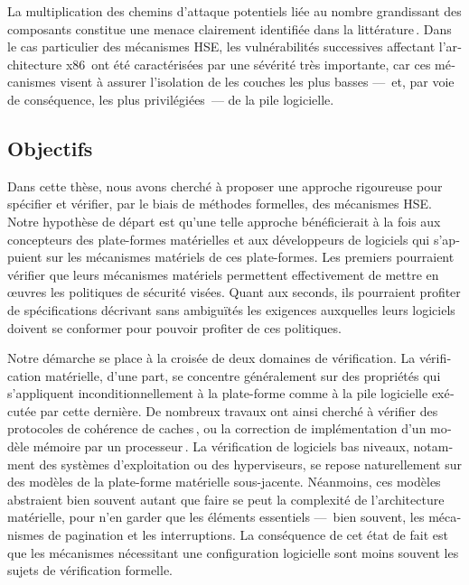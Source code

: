 \begin{otherlanguage}{french}
  La multiplication des chemins d’attaque potentiels liée au nombre grandissant
  des composants constitue une menace clairement identifiée dans la
  littérature\,\cite{wing2003compositionalattack}.
  Dans le cas particulier des mécanismes HSE, les vulnérabilités successives
  affectant l’architecture
  x86\,\cite{duflot2009smram,wojtczuk2009smram,domas2015sinkhole,kallenberg2015racecondition,kovah2015senter}
  ont été caractérisées par une sévérité très importante, car ces mécanismes
  visent à assurer l’isolation de les couches les plus basses ---~et, par voie de
  conséquence, les plus privilégiées~--- de la pile logicielle.

  \subsection*{Objectifs}

  Dans cette thèse, nous avons cherché à proposer une approche rigoureuse pour
  spécifier et vérifier, par le biais de méthodes formelles, des mécanismes HSE.
  Notre hypothèse de départ est qu’une telle approche bénéficierait à la fois
  aux concepteurs des plate-formes matérielles et aux développeurs de logiciels
  qui s'appuient sur les mécanismes matériels de ces plate-formes.
  Les premiers pourraient vérifier que leurs mécanismes matériels permettent
  effectivement de mettre en œuvres les politiques de sécurité visées.
  Quant aux seconds, ils pourraient profiter de spécifications décrivant sans
  ambiguïtés les exigences auxquelles leurs logiciels doivent se conformer pour
  pouvoir profiter de ces politiques.

  Notre démarche se place à la croisée de deux domaines de vérification.
  La vérification matérielle, d’une part, se concentre généralement sur des
  propriétés qui s’appliquent inconditionnellement à la plate-forme comme à la
  pile logicielle exécutée par cette dernière.
  De nombreux travaux ont ainsi cherché à vérifier des protocoles de cohérence
  de caches\,\cite{stern1995cachecoherence,vijayaraghavan2015modular}, ou la
  correction de implémentation d’un modèle mémoire par un
  processeur\,\cite{choi2017kami}.
  La vérification de logiciels bas niveaux, notamment des systèmes
  d’exploitation ou des hyperviseurs, se repose naturellement sur des modèles de
  la plate-forme matérielle sous-jacente.
  Néanmoins, ces modèles abstraient bien souvent autant que faire se peut la
  complexité de l’architecture matérielle, pour n’en garder que les éléments
  essentiels ---~bien souvent, les mécanismes de pagination et les
  interruptions.
  La conséquence de cet état de fait est que les mécanismes nécessitant une
  configuration logicielle sont moins souvent les sujets de vérification
  formelle.


\end{otherlanguage}
